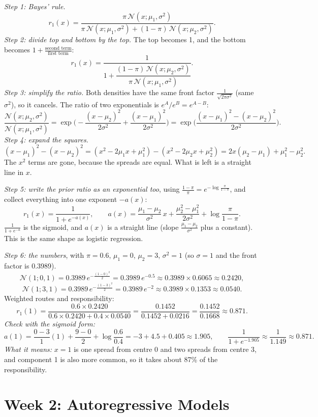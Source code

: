 \documentclass[12pt,a4paper]{article}
\begin{document}
\emph{Step 1: Bayes' rule.}
\[
r_1(x)=\frac{\pi\,\mathcal{N}(x;\mu_1,\sigma^2)}{\pi\,\mathcal{N}(x;\mu_1,\sigma^2)+(1-\pi)\,\mathcal{N}(x;\mu_2,\sigma^2)} .
\]
\emph{Step 2: divide top and bottom by the top.} The top becomes 1, and the bottom becomes $1+\frac{\text{second term}}{\text{first term}}$:
\[
r_1(x)=\frac{1}{1+\dfrac{(1-\pi)\,\mathcal{N}(x;\mu_2,\sigma^2)}{\pi\,\mathcal{N}(x;\mu_1,\sigma^2)}} .
\]
\emph{Step 3: simplify the ratio.} Both densities have the same front factor $\frac{1}{\sqrt{2\pi\sigma^2}}$ (same $\sigma^2$), so it cancels. The ratio of two exponentials is $e^{A}/e^{B}=e^{A-B}$:
\[
\frac{\mathcal{N}(x;\mu_2,\sigma^2)}{\mathcal{N}(x;\mu_1,\sigma^2)}=\exp\!\Big(-\frac{(x-\mu_2)^2}{2\sigma^2}+\frac{(x-\mu_1)^2}{2\sigma^2}\Big)=\exp\!\Big(\frac{(x-\mu_1)^2-(x-\mu_2)^2}{2\sigma^2}\Big).
\]
\emph{Step 4: expand the squares.}
\[
(x-\mu_1)^2-(x-\mu_2)^2=(x^2-2\mu_1x+\mu_1^2)-(x^2-2\mu_2x+\mu_2^2)=2x(\mu_2-\mu_1)+\mu_1^2-\mu_2^2 .
\]
The $x^2$ terms are gone, because the spreads are equal. What is left is a straight line in $x$.

\emph{Step 5: write the prior ratio as an exponential too}, using $\frac{1-\pi}{\pi}=e^{-\log\frac{\pi}{1-\pi}}$, and collect everything into one exponent $-a(x)$:
\[
r_1(x)=\frac{1}{1+e^{-a(x)}},\qquad a(x)=\frac{\mu_1-\mu_2}{\sigma^2}\,x+\frac{\mu_2^2-\mu_1^2}{2\sigma^2}+\log\frac{\pi}{1-\pi}.
\]
$\frac{1}{1+e^{-a}}$ is the sigmoid, and $a(x)$ is a straight line (slope $\frac{\mu_1-\mu_2}{\sigma^2}$ plus a constant). This is the same shape as logistic regression.

\emph{Step 6: the numbers}, with $\pi=0.6$, $\mu_1=0$, $\mu_2=3$, $\sigma^2=1$ (so $\sigma=1$ and the front factor is 0.3989).
\[
\mathcal{N}(1;0,1)=0.3989\,e^{-\frac{(1-0)^2}{2}}=0.3989\,e^{-0.5}\approx0.3989\times0.6065\approx0.2420,
\]
\[
\mathcal{N}(1;3,1)=0.3989\,e^{-\frac{(1-3)^2}{2}}=0.3989\,e^{-2}\approx0.3989\times0.1353\approx0.0540 .
\]
Weighted routes and responsibility:
\[
r_1(1)=\frac{0.6\times0.2420}{0.6\times0.2420+0.4\times0.0540}=\frac{0.1452}{0.1452+0.0216}=\frac{0.1452}{0.1668}\approx0.871 .
\]
\emph{Check with the sigmoid form:}
\[
a(1)=\frac{0-3}{1}(1)+\frac{9-0}{2}+\log\frac{0.6}{0.4}=-3+4.5+0.405\approx1.905,\qquad \frac{1}{1+e^{-1.905}}\approx\frac{1}{1.149}\approx0.871 .
\]
\emph{What it means:} $x=1$ is one spread from centre 0 and two spreads from centre 3, and component 1 is also more common, so it takes about 87\% of the responsibility.
\part{Week 2: Autoregressive Models}
\end{document}
